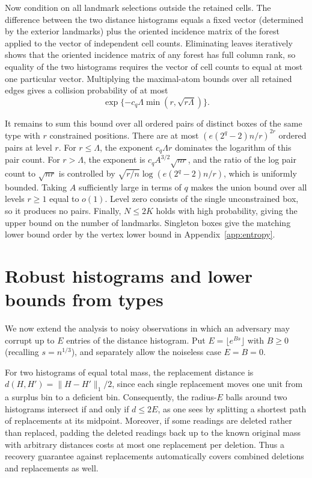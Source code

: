 Now condition on all landmark selections outside the retained cells. The difference between the two distance histograms equals a fixed vector (determined by the exterior landmarks) plus the oriented incidence matrix of the forest applied to the vector of independent cell counts. Eliminating leaves iteratively shows that the oriented incidence matrix of any forest has full column rank, so equality of the two histograms requires the vector of cell counts to equal at most one particular vector. Multiplying the maximal-atom bounds over all retained edges gives a collision probability of at most
\[
 \exp\{-c_q \Lambda\min(r,\sqrt{r\Lambda})\}.
\]

It remains to sum this bound over all ordered pairs of distinct boxes of the same type with $r$ constrained positions. There are at most $(e(2^q-2)n/r)^{2r}$ ordered pairs at level $r$. For $r\le \Lambda$, the exponent $c_q \Lambda r$ dominates the logarithm of this pair count. For $r>\Lambda$, the exponent is $c_q A^{3/2}\sqrt{nr}$, and the ratio of the log pair count to $\sqrt{nr}$ is controlled by $\sqrt{r/n}\log(e(2^q-2)n/r)$, which is uniformly bounded. Taking $A$ sufficiently large in terms of $q$ makes the union bound over all levels $r\ge1$ equal to $o(1)$. Level zero consists of the single unconstrained box, so it produces no pairs. Finally, $N\le2K$ holds with high probability, giving the upper bound on the number of landmarks. Singleton boxes give the matching lower bound order by the vertex lower bound in Appendix~\ref{app:entropy}.

\section{Robust histograms and lower bounds from types}
We now extend the analysis to noisy observations in which an adversary may corrupt up to $E$ entries of the distance histogram. Put $E=\lfloor e^{Bs}\rfloor$ with $B\ge0$ (recalling $s=n^{1/3}$), and separately allow the noiseless case $E=B=0$.

For two histograms of equal total mass, the replacement distance is $d(H,H')=\|H-H'\|_1/2$, since each single replacement moves one unit from a surplus bin to a deficient bin. Consequently, the radius-$E$ balls around two histograms intersect if and only if $d\le2E$, as one sees by splitting a shortest path of replacements at its midpoint. Moreover, if some readings are deleted rather than replaced, padding the deleted readings back up to the known original mass with arbitrary distances costs at most one replacement per deletion. Thus a recovery guarantee against replacements automatically covers combined deletions and replacements as well.

